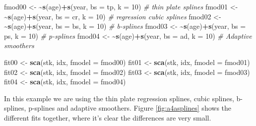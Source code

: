 \documentclass[
]{book}
\newenvironment{Shaded}{\begin{snugshade}}{\end{snugshade}}
\newcommand{\AttributeTok}[1]{\textcolor[rgb]{0.13,0.29,0.53}{#1}}
\newcommand{\CommentTok}[1]{\textcolor[rgb]{0.56,0.35,0.01}{\textit{#1}}}
\newcommand{\DecValTok}[1]{\textcolor[rgb]{0.00,0.00,0.81}{#1}}
\newcommand{\ErrorTok}[1]{\textcolor[rgb]{0.64,0.00,0.00}{\textbf{#1}}}
\newcommand{\FunctionTok}[1]{\textcolor[rgb]{0.13,0.29,0.53}{\textbf{#1}}}
\newcommand{\NormalTok}[1]{#1}
\newcommand{\OtherTok}[1]{\textcolor[rgb]{0.56,0.35,0.01}{#1}}
\newcommand{\SpecialCharTok}[1]{\textcolor[rgb]{0.81,0.36,0.00}{\textbf{#1}}}
\newcommand{\StringTok}[1]{\textcolor[rgb]{0.31,0.60,0.02}{#1}}
\begin{document}
\begin{Shaded}
\begin{Highlighting}[]
\NormalTok{fmod00 }\OtherTok{\textless{}{-}} \ErrorTok{\textasciitilde{}}\FunctionTok{s}\NormalTok{(age)}\SpecialCharTok{+}\FunctionTok{s}\NormalTok{(year, }\AttributeTok{bs =} \StringTok{\textquotesingle{}tp\textquotesingle{}}\NormalTok{, }\AttributeTok{k =} \DecValTok{10}\NormalTok{) }\CommentTok{\# thin plate splines}
\NormalTok{fmod01 }\OtherTok{\textless{}{-}} \ErrorTok{\textasciitilde{}}\FunctionTok{s}\NormalTok{(age)}\SpecialCharTok{+}\FunctionTok{s}\NormalTok{(year, }\AttributeTok{bs =} \StringTok{\textquotesingle{}cr\textquotesingle{}}\NormalTok{, }\AttributeTok{k =} \DecValTok{10}\NormalTok{) }\CommentTok{\# regression cubic splines}
\NormalTok{fmod02 }\OtherTok{\textless{}{-}} \ErrorTok{\textasciitilde{}}\FunctionTok{s}\NormalTok{(age)}\SpecialCharTok{+}\FunctionTok{s}\NormalTok{(year, }\AttributeTok{bs =} \StringTok{\textquotesingle{}bs\textquotesingle{}}\NormalTok{, }\AttributeTok{k =} \DecValTok{10}\NormalTok{) }\CommentTok{\# b{-}splines}
\NormalTok{fmod03 }\OtherTok{\textless{}{-}} \ErrorTok{\textasciitilde{}}\FunctionTok{s}\NormalTok{(age)}\SpecialCharTok{+}\FunctionTok{s}\NormalTok{(year, }\AttributeTok{bs =} \StringTok{\textquotesingle{}ps\textquotesingle{}}\NormalTok{, }\AttributeTok{k =} \DecValTok{10}\NormalTok{) }\CommentTok{\# p{-}splines}
\NormalTok{fmod04 }\OtherTok{\textless{}{-}} \ErrorTok{\textasciitilde{}}\FunctionTok{s}\NormalTok{(age)}\SpecialCharTok{+}\FunctionTok{s}\NormalTok{(year, }\AttributeTok{bs =} \StringTok{\textquotesingle{}ad\textquotesingle{}}\NormalTok{, }\AttributeTok{k =} \DecValTok{10}\NormalTok{) }\CommentTok{\# Adaptive smoothers}

\NormalTok{fit00 }\OtherTok{\textless{}{-}} \FunctionTok{sca}\NormalTok{(stk, idx, }\AttributeTok{fmodel =}\NormalTok{ fmod00)}
\NormalTok{fit01 }\OtherTok{\textless{}{-}} \FunctionTok{sca}\NormalTok{(stk, idx, }\AttributeTok{fmodel =}\NormalTok{ fmod01)}
\NormalTok{fit02 }\OtherTok{\textless{}{-}} \FunctionTok{sca}\NormalTok{(stk, idx, }\AttributeTok{fmodel =}\NormalTok{ fmod02)}
\NormalTok{fit03 }\OtherTok{\textless{}{-}} \FunctionTok{sca}\NormalTok{(stk, idx, }\AttributeTok{fmodel =}\NormalTok{ fmod03)}
\NormalTok{fit04 }\OtherTok{\textless{}{-}} \FunctionTok{sca}\NormalTok{(stk, idx, }\AttributeTok{fmodel =}\NormalTok{ fmod04)}
\end{Highlighting}
\end{Shaded}

In this example we are using the thin plate regression splines, cubic splines, b-splines, p-splines and adaptive smoothers. Figure \ref{fig:a4asplines} shows the different fits together, where it's clear the differences are very small.
\end{document}

